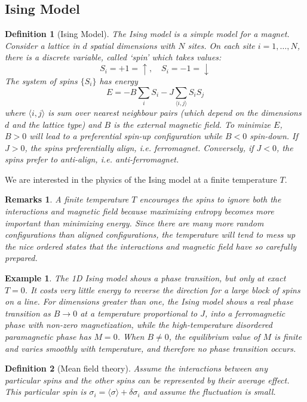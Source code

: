 \documentclass[a4paper]{article}
\newtheorem{eg}{Example}[section]
\newtheorem{remarks}{Remarks}[section]
\theoremstyle{new}
\newtheorem{defi}{Definition}[section]
\begin{document}
\subsection{Ising Model}
\begin{defi}[Ising Model]
The Ising model is a simple model for a magnet. Consider a lattice in $d$ spatial dimensions with $N$ sites. On each site $i=1,\dots,N$, there is a discrete variable, called `spin' which takes values:
$$S_i=+1=\uparrow,\quad S_i=-1=\downarrow$$
The system of spins $\{S_i\}$ has energy
$$E=-B\sum_iS_i-J\sum_{\langle i,j\rangle}S_iS_j$$
where $\langle i,j\rangle$ is sum over nearest neighbour pairs (which depend on the dimensions $d$ and the lattice type) and $B$ is the external magnetic field. To minimize $E$, $B>0$ will lead to a preferential spin-up configuration while $B<0$ spin-down. If $J>0$, the spins preferentially align, i.e. ferromagnet. Conversely, if $J<0$, the spins prefer to anti-align, i.e. anti-ferromagnet.
\end{defi}
We are interested in the physics of the Ising model at a finite temperature $T$.
\begin{remarks}
A finite temperature $T$ encourages the spins to ignore both the interactions and magnetic field because maximizing entropy becomes more important than minimizing energy. Since there are many more random configurations than aligned configurations, the temperature will tend to mess up the nice ordered states that the interactions and magnetic field have so carefully prepared.
\end{remarks}
\begin{eg}
The 1D Ising model shows a phase transition, but only at exact $T=0$. It costs very little energy to reverse the direction for a large block of spins on a line. For dimensions greater than one, the Ising model shows a real phase transition as $B\rightarrow 0$ at a temperature proportional to $J$, into a ferromagnetic phase with non-zero magnetization, while the high-temperature disordered paramagnetic phase has $M=0$. When $B\neq 0$, the equilibrium value of $M$ is finite and varies smoothly with temperature, and therefore no phase transition occurs.
\end{eg}
\begin{defi}[Mean field theory]
Assume the interactions between any particular spins and the other spins can be represented by their average effect. This particular spin is $\sigma_i=\langle\sigma\rangle+\delta\sigma_i$ and assume the fluctuation is small.
\end{defi}
\end{document}
